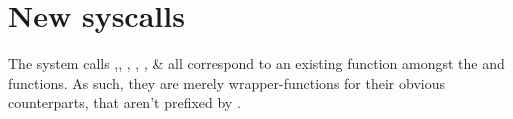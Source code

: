 \section{New syscalls}
The system calls ,,
, ,
,  \&
 all correspond to an existing function
amongst the  and  functions. As such, they
are merely wrapper-functions for their obvious counterparts, that aren't prefixed
by .
